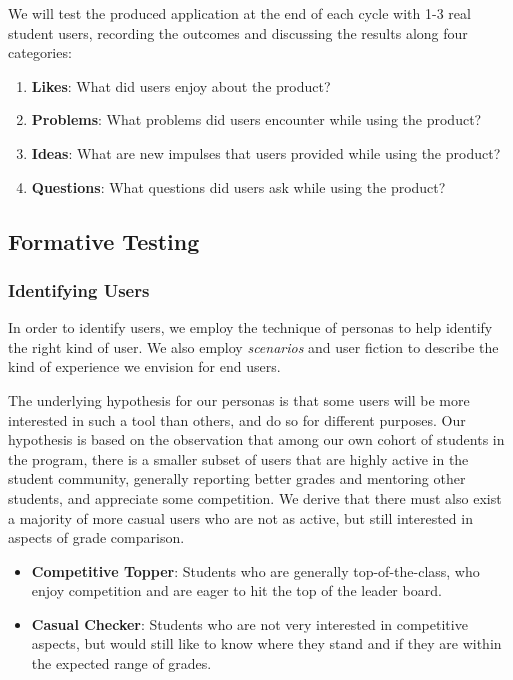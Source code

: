 We will test the produced application at the end of each cycle with 1-3 real student users, recording the outcomes and discussing the results along four categories:

\begin{enumerate}
    \item \textbf{Likes}: What did users enjoy about the product?
    \item \textbf{Problems}: What problems did users encounter while using the product?
    \item \textbf{Ideas}: What are new impulses that users provided while using the product?
     \item \textbf{Questions}: What questions did users ask while using the product?
\end{enumerate}

\subsection{Formative Testing}\label{sec:formative}
\subsubsection{Identifying Users}
In order to identify users, we employ the technique of personas to help identify the right kind of user. We also employ \textit{scenarios} and user fiction to describe the kind of experience we envision for end users.

The underlying hypothesis for our personas is that some users will be more interested in such a tool than others, and do so for different purposes. Our hypothesis is based on the observation that among our own cohort of students in the program, there is a smaller subset of users that are highly active in the student community, generally reporting better grades and mentoring other students, and appreciate some competition. We derive that there must also exist a majority of more casual users who are not as active, but still interested in aspects of grade comparison.

\begin{itemize}
    \item \textbf{Competitive Topper}: Students who are generally top-of-the-class, who enjoy competition and are eager to hit the top of the leader board.
    \item \textbf{Casual Checker}: Students who are not very interested in competitive aspects, but would still like to know where they stand and if they are within the expected range of grades.
\end{itemize}

